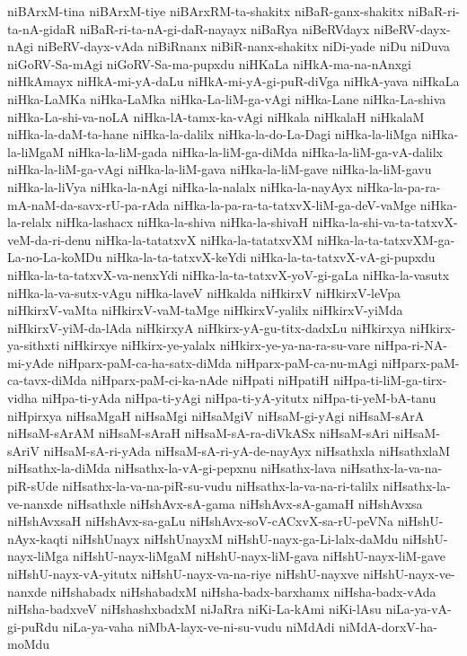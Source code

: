 {niBArxM-tina
niBArxM-tiye
niBArxRM-ta-shakitx
niBaR-ganx-shakitx
niBaR-ri-ta-nA-gidaR
niBaR-ri-ta-nA-gi-daR-nayayx
niBaRya
niBeRVdayx
niBeRV-dayx-nAgi
niBeRV-dayx-vAda
niBiRnanx
niBiR-nanx-shakitx
niDi-yade
niDu
niDuva
niGoRV-Sa-mAgi
niGoRV-Sa-ma-pupxdu
niHKaLa
niHkA-ma-na-nAnxgi
niHkAmayx
niHkA-mi-yA-daLu
niHkA-mi-yA-gi-puR-diVga
niHkA-yava
niHkaLa
niHka-LaMKa
niHka-LaMka
niHka-La-liM-ga-vAgi
niHka-Lane
niHka-La-shiva
niHka-La-shi-va-noLA
niHka-lA-tamx-ka-vAgi
niHkala
niHkalaH
niHkalaM
niHka-la-daM-ta-hane
niHka-la-dalilx
niHka-la-do-La-Dagi
niHka-la-liMga
niHka-la-liMgaM
niHka-la-liM-gada
niHka-la-liM-ga-diMda
niHka-la-liM-ga-vA-dalilx
niHka-la-liM-ga-vAgi
niHka-la-liM-gava
niHka-la-liM-gave
niHka-la-liM-gavu
niHka-la-liVya
niHka-la-nAgi
niHka-la-nalalx
niHka-la-nayAyx
niHka-la-pa-ra-mA-naM-da-savx-rU-pa-rAda
niHka-la-pa-ra-ta-tatxvX-liM-ga-deV-vaMge
niHka-la-relalx
niHka-lashacx
niHka-la-shiva
niHka-la-shivaH
niHka-la-shi-va-ta-tatxvX-veM-da-ri-denu
niHka-la-tatatxvX
niHka-la-tatatxvXM
niHka-la-ta-tatxvXM-ga-La-no-La-koMDu
niHka-la-ta-tatxvX-keYdi
niHka-la-ta-tatxvX-vA-gi-pupxdu
niHka-la-ta-tatxvX-va-nenxYdi
niHka-la-ta-tatxvX-yoV-gi-gaLa
niHka-la-vasutx
niHka-la-va-sutx-vAgu
niHka-laveV
niHkalda
niHkirxV
niHkirxV-leVpa
niHkirxV-vaMta
niHkirxV-vaM-taMge
niHkirxV-yalilx
niHkirxV-yiMda
niHkirxV-yiM-da-lAda
niHkirxyA
niHkirx-yA-gu-titx-dadxLu
niHkirxya
niHkirx-ya-sithxti
niHkirxye
niHkirx-ye-yalalx
niHkirx-ye-ya-na-ra-su-vare
niHpa-ri-NA-mi-yAde
niHparx-paM-ca-ha-satx-diMda
niHparx-paM-ca-nu-mAgi
niHparx-paM-ca-tavx-diMda
niHparx-paM-ci-ka-nAde
niHpati
niHpatiH
niHpa-ti-liM-ga-tirx-vidha
niHpa-ti-yAda
niHpa-ti-yAgi
niHpa-ti-yA-yitutx
niHpa-ti-yeM-bA-tanu
niHpirxya
niHsaMgaH
niHsaMgi
niHsaMgiV
niHsaM-gi-yAgi
niHsaM-sArA
niHsaM-sArAM
niHsaM-sAraH
niHsaM-sA-ra-diVkASx
niHsaM-sAri
niHsaM-sAriV
niHsaM-sA-ri-yAda
niHsaM-sA-ri-yA-de-nayAyx
niHsathxla
niHsathxlaM
niHsathx-la-diMda
niHsathx-la-vA-gi-pepxnu
niHsathx-lava
niHsathx-la-va-na-piR-sUde
niHsathx-la-va-na-piR-su-vudu
niHsathx-la-va-na-ri-talilx
niHsathx-la-ve-nanxde
niHsathxle
niHshAvx-sA-gama
niHshAvx-sA-gamaH
niHshAvxsa
niHshAvxsaH
niHshAvx-sa-gaLu
niHshAvx-soV-cACxvX-sa-rU-peVNa
niHshU-nAyx-kaqti
niHshUnayx
niHshUnayxM
niHshU-nayx-ga-Li-lalx-daMdu
niHshU-nayx-liMga
niHshU-nayx-liMgaM
niHshU-nayx-liM-gava
niHshU-nayx-liM-gave
niHshU-nayx-vA-yitutx
niHshU-nayx-va-na-riye
niHshU-nayxve
niHshU-nayx-ve-nanxde
niHshabadx
niHshabadxM
niHsha-badx-barxhamx
niHsha-badx-vAda
niHsha-badxveV
niHshashxbadxM
niJaRra
niKi-La-kAmi
niKi-lAsu
niLa-ya-vA-gi-puRdu
niLa-ya-vaha
niMbA-layx-ve-ni-su-vudu
niMdAdi
niMdA-dorxV-ha-moMdu
}
